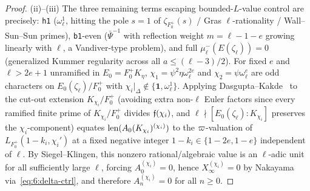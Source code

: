 \begin{proof}
(ii)--(iii) The three remaining terms escaping bounded-$L$-value control are precisely: \texttt{h1} ($\omega_\ell^1$, hitting the pole $s=1$ of $\zeta_{F_0^+}(s)$ / Gras $\ell$-rationality / Wall--Sun--Sun primes), \texttt{b1}-even ($\bar\Psi^{-1}$ with reflection weight $m = \ell - 1 - e$ growing linearly with $\ell$, a Vandiver-type problem), and full $\mu_\ell^-(E(\zeta_\ell)) = 0$ (generalized Kummer regularity across all $a \le (\ell-3)/2$). For fixed $e$ and $\ell > 2e+1$ unramified in $E_0 = F_0^+ K_\eta$, $\chi_1 = \psi^2\eta\omega_\ell^{2e}$ and $\chi_2 = \psi\omega_\ell^e$ are odd characters on $E_0(\zeta_\ell)/F_0^+$ with $\chi_i|_\Delta \notin \{\mathbf{1}, \omega_\ell^1\}$. Applying Dasgupta--Kakde~\cite[Thm.~1.2]{DK2023} to the cut-out extension $K_{\chi_i}/F_0^+$ (avoiding extra non-$\ell$ Euler factors since every ramified finite prime of $K_{\chi_i}/F_0^+$ divides $\mathfrak{f}(\chi_i)$, and $\ell \nmid [E_0(\zeta_\ell) : K_{\chi_i}]$ preserves the $\chi_i$-component) equates $\operatorname{len}(A_0(K_{\chi_i})^{(\chi_i)})$ to the $\varpi$-valuation of $L_{F_0^+}(1-k_i, \chi_i')$ at a fixed negative integer $1 - k_i \in \{1-2e, 1-e\}$ independent of $\ell$. By Siegel--Klingen, this nonzero rational/algebraic value is an $\ell$-adic unit for all sufficiently large $\ell$, forcing $A_0^{(\chi_i)} = 0$, hence $X_\infty^{(\chi_i)} = 0$ by Nakayama via~\eqref{eq:6:delta-ctrl}, and therefore $A_n^{(\chi_i)} = 0$ for all $n \ge 0$.
\end{proof}
